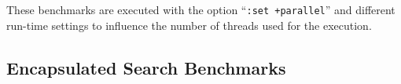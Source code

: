 \documentclass{article}
\begin{document}
These benchmarks are executed with the option ``\texttt{:set +parallel}''
and different run-time settings to influence the number
of threads used for the execution.

\begin{center}
\end{center}


\subsection{Encapsulated Search Benchmarks}

\begin{center}
\end{center}
\end{document}
